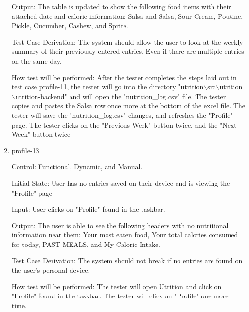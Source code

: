 \documentclass[12pt, titlepage]{article}
\begin{document}
\begin{enumerate}
		Output: The table is updated to show the following food items with their attached date and calorie information: Salsa and Salsa, Sour Cream, Poutine, Pickle, Cucumber, Cashew, and Sprite.
		
		Test Case Derivation: The system should allow the user to look at the weekly summary of their previously entered entries. Even if there are multiple entries on the same day.
		
		How test will be performed: After the tester completes the steps laid out in test case profile-11, the tester will go into the directory "utrition$\backslash$src$\backslash$utrition$\backslash$utrition-backend" and will open the "nutrition\_log.csv" file. The tester copies and pastes the Salsa row once more at the bottom of the excel file. The tester will save the "nutrition\_log.csv" changes, and refreshes the "Profile" page. The tester clicks on the "Previous Week" button twice, and the "Next Week" button twice.
		
		\item{profile-13\\}
		
		Control: Functional, Dynamic, and Manual.
		
		Initial State: User has no entries saved on their device and is viewing the "Profile" page.
		
		Input: User clicks on "Profile" found in the taskbar.
		
		Output: The user is able to see the following headers with no nutritional information near them: Your most eaten food, Your total calories consumed for today, PAST MEALS, and My Caloric Intake.
		
		Test Case Derivation: The system should not break if no entries are found on the user's personal device.
		
		How test will be performed: The tester will open Utrition and click on "Profile" found in the taskbar. The tester will click on "Profile" one more time.
		
	\end{enumerate}
	
\end{document}
